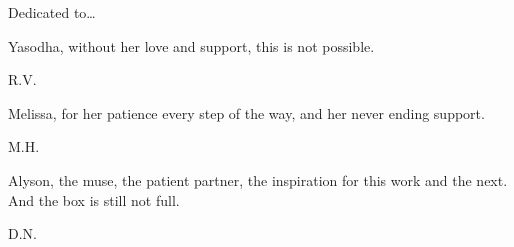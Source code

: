 \newpage


Dedicated to\dots \twomedskip


\begin{minipage}[t]{0.8\textwidth}
	\raggedright
		Yasodha, without her love and support, this is not possible. \par
  	\raggedleft
  	R.V.
\end{minipage} \vspace{1cm}


\begin{minipage}[t]{0.8\textwidth}
	\raggedright
		Melissa, for her patience every step of the way, and her never ending support. \par
  	\raggedleft
  	M.H.
\end{minipage} \vspace{1cm}


\begin{minipage}[t]{0.8\textwidth}
	\raggedright
		Alyson, the muse, the patient partner, the inspiration for this work and the next. And the box is still not full. \par
  	\raggedleft
  	D.N.
\end{minipage} 